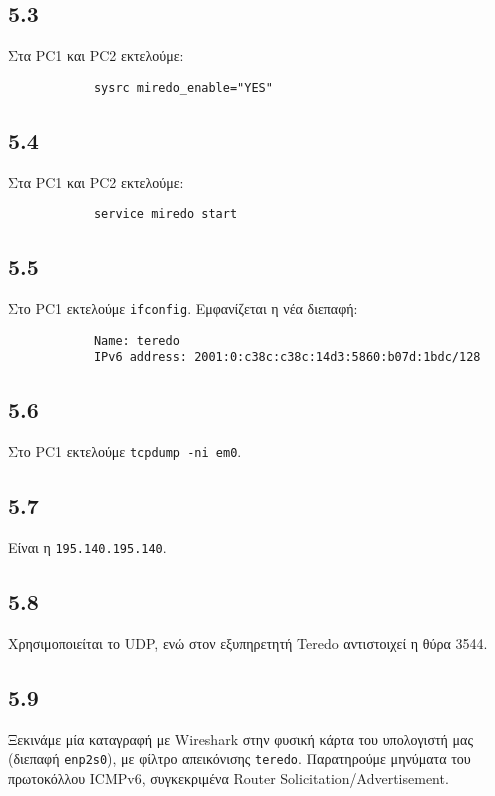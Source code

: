 \documentclass[a4paper, 12pt]{article}
\begin{document}
	\subsection*{5.3}
		Στα PC1 και PC2 εκτελούμε:
			
		\begin{verbatim}
			sysrc miredo_enable="YES"
		\end{verbatim}

	\subsection*{5.4}
		Στα PC1 και PC2 εκτελούμε:
		
		\begin{verbatim}
			service miredo start
		\end{verbatim}

	\subsection*{5.5}
		Στο PC1 εκτελούμε \verb|ifconfig|. Εμφανίζεται η νέα διεπαφή:
		
		\begin{verbatim}
			Name: teredo
			IPv6 address: 2001:0:c38c:c38c:14d3:5860:b07d:1bdc/128
		\end{verbatim}

	\subsection*{5.6}
		Στο PC1 εκτελούμε \verb|tcpdump -ni em0|.

	\subsection*{5.7}
		Είναι η \verb|195.140.195.140|.

	\subsection*{5.8}
		Χρησιμοποιείται το UDP, ενώ στον εξυπηρετητή Teredo αντιστοιχεί η θύρα 3544.

	\subsection*{5.9}
		Ξεκινάμε μία καταγραφή με Wireshark στην φυσική κάρτα του υπολογιστή μας (διεπαφή \verb|enp2s0|), με φίλτρο απεικόνισης \verb|teredo|. Παρατηρούμε μηνύματα του πρωτοκόλλου ICMPv6, συγκεκριμένα Router Solicitation/Advertisement.
\end{document}
